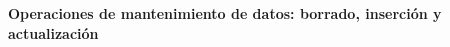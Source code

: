 \begin{center}
    \textbf{Operaciones de mantenimiento de datos: borrado, inserción y actualización}
\end{center}
